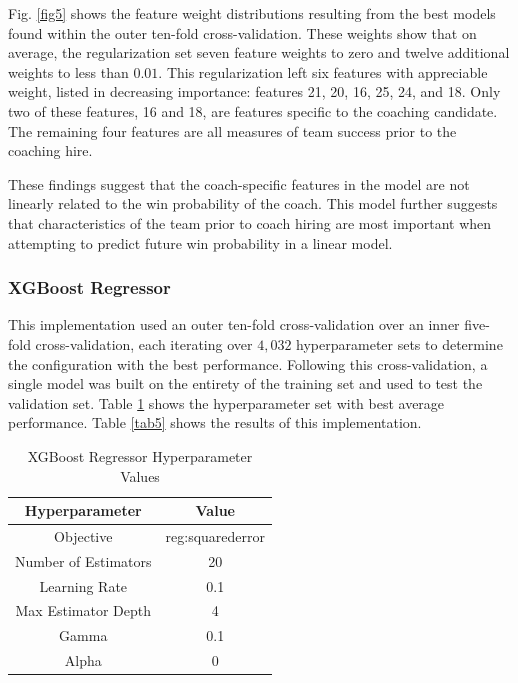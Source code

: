\documentclass[conference]{IEEEtran}
\begin{document}
Fig. \ref{fig5} shows the feature weight distributions resulting from the best models found within the outer ten-fold cross-validation. These weights show that on average, the regularization set seven feature weights to zero and twelve additional weights to less than $0.01$. This regularization left six features with appreciable weight, listed in decreasing importance: features 21, 20, 16, 25, 24, and 18. Only two of these features, 16 and 18, are features specific to the coaching candidate. The remaining four features are all measures of team success prior to the coaching hire. 

These findings suggest that the coach-specific features in the model are not linearly related to the win probability of the coach. This model further suggests that characteristics of the team prior to coach hiring are most important when attempting to predict future win probability in a linear model.

\subsubsection{XGBoost Regressor}
This implementation used an outer ten-fold cross-validation over an inner five-fold cross-validation, each iterating over $4,032$ hyperparameter sets to determine the configuration with the best performance. Following this cross-validation, a single model was built on the entirety of the training set and used to test the validation set. Table \ref{tab4} shows the hyperparameter set with best average performance. Table \ref{tab5} shows the results of this implementation.

\begin{table}[htbp]
\caption{XGBoost Regressor Hyperparameter Values}
\begin{center}
\begin{tabular}{|c||c|}
\hline
\textbf{Hyperparameter} & \textbf{Value} \\
\hline
\hline
Objective & reg:squarederror \\
\hline
Number of Estimators & 20 \\
\hline
Learning Rate & 0.1 \\
\hline
Max Estimator Depth & 4 \\
\hline
Gamma & 0.1 \\
\hline
Alpha & 0 \\
\hline
\end{tabular}
\label{tab4}
\end{center}
\end{table}
\end{document}
